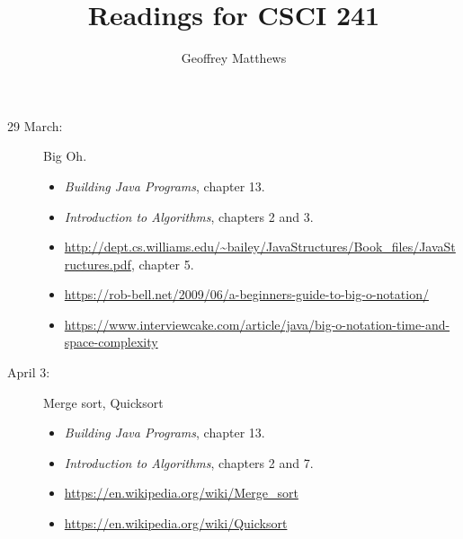 \documentclass{article}
\title{Readings for CSCI 241}
\author{Geoffrey Matthews}
\begin{document}
\maketitle
\begin{description}
\item[29 March:]  Big Oh.
  
  \begin{itemize}
    \item {\em Building Java Programs}, chapter 13.
    \item {\em Introduction to Algorithms}, chapters 2 and 3.
      \item \url{http://dept.cs.williams.edu/~bailey/JavaStructures/Book_files/JavaStructures.pdf}, chapter 5.
  \item \url{https://rob-bell.net/2009/06/a-beginners-guide-to-big-o-notation/}
    \item \url{https://www.interviewcake.com/article/java/big-o-notation-time-and-space-complexity}
  \end{itemize}

\item[April 3:] Merge sort, Quicksort
  \begin{itemize}
    \item {\em Building Java Programs}, chapter 13.
  \item {\em Introduction to Algorithms}, chapters 2 and 7.
  \item\url{https://en.wikipedia.org/wiki/Merge_sort}
    \item\url{https://en.wikipedia.org/wiki/Quicksort}
  \end{itemize}

\end{description}
\end{document}
